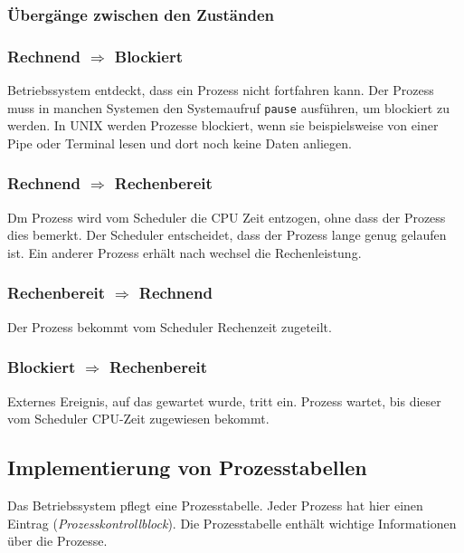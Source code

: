 \subsubsection{Übergänge zwischen den Zuständen}

\subsubsection*{Rechnend $\Rightarrow$ Blockiert}

Betriebssystem entdeckt, dass ein Prozess nicht fortfahren kann. Der Prozess
muss in manchen Systemen den Systemaufruf \texttt{pause} ausführen, um
blockiert zu werden. In UNIX werden Prozesse blockiert, wenn sie beispielsweise
von einer Pipe oder Terminal lesen und dort noch keine Daten anliegen.

\subsubsection*{Rechnend $\Rightarrow$ Rechenbereit}

Dm Prozess wird vom Scheduler die CPU Zeit entzogen, ohne dass der Prozess dies
bemerkt. Der Scheduler entscheidet, dass der Prozess lange genug gelaufen ist.
Ein anderer Prozess erhält nach wechsel die Rechenleistung.

\subsubsection*{Rechenbereit $\Rightarrow$ Rechnend}

Der Prozess bekommt vom Scheduler Rechenzeit zugeteilt.

\subsubsection*{Blockiert $\Rightarrow$ Rechenbereit}

Externes Ereignis, auf das gewartet wurde, tritt ein. Prozess wartet, bis
dieser vom Scheduler CPU-Zeit zugewiesen bekommt.

\subsection{Implementierung von Prozesstabellen}

Das Betriebssystem pflegt eine Prozesstabelle. Jeder Prozess hat hier einen
Eintrag (\textit{Prozesskontrollblock}). Die Prozesstabelle enthält wichtige
Informationen über die Prozesse.

